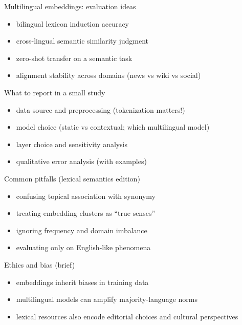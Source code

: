\documentclass{beamer}
\begin{document}
\begin{frame}{Multilingual embeddings: evaluation ideas}
\begin{itemize}
  \item bilingual lexicon induction accuracy
  \item cross-lingual semantic similarity judgment
  \item zero-shot transfer on a semantic task
  \item alignment stability across domains (news vs wiki vs social)
\end{itemize}
\end{frame}

\begin{frame}{What to report in a small study}
\begin{itemize}
  \item data source and preprocessing (tokenization matters!)
  \item model choice (static vs contextual; which multilingual model)
  \item layer choice and sensitivity analysis
  \item qualitative error analysis (with examples)
\end{itemize}
\end{frame}

\begin{frame}{Common pitfalls (lexical semantics edition)}
\begin{itemize}
  \item confusing topical association with synonymy
  \item treating embedding clusters as ``true senses''
  \item ignoring frequency and domain imbalance
  \item evaluating only on English-like phenomena
\end{itemize}
\end{frame}

\begin{frame}{Ethics and bias (brief)}
\begin{itemize}
  \item embeddings inherit biases in training data
  \item multilingual models can amplify majority-language norms
  \item lexical resources also encode editorial choices and cultural perspectives
\end{itemize}
\end{frame}
\end{document}
